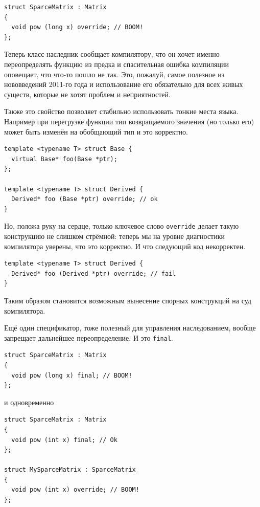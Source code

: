 \documentclass[a4paper,12pt,oneside]{article}
\begin{document}
\begin{lstlisting}
struct SparceMatrix : Matrix
{
  void pow (long x) override; // BOOM!
};
\end{lstlisting}

Теперь класс-наследник сообщает компилятору, что он хочет именно переопределять функцию из предка и спасительная ошибка компиляции оповещает, что что-то пошло не так. Это, пожалуй, самое полезное из нововведений 2011-го года и использование его обязательно для всех живых существ, которые не хотят проблем и неприятностей.

Также это свойство позволяет стабильно использовать тонкие места языка. Например при перегрузке функции тип возвращаемого значения (но только его) может быть изменён на обобщающий тип и это корректно.

\begin{lstlisting}
template <typename T> struct Base {
  virtual Base* foo(Base *ptr);
};

template <typename T> struct Derived {
  Derived* foo (Base *ptr) override; // ok
}
\end{lstlisting}

Но, положа руку на сердце, только ключевое слово \lstinline!override! делает такую конструкцию не слишком стрёмной: теперь мы на уровне диагностики компилятора уверены, что это корректно. И что следующий код некорректен.

\begin{lstlisting}
template <typename T> struct Derived {
  Derived* foo (Derived *ptr) override; // fail
}
\end{lstlisting}

Таким образом становится возможным вынесение спорных конструкций на суд компилятора.

Ещё один спецификатор, тоже полезный для управления наследованием, вообще запрещает дальнейшее переопределение. И это \lstinline!final!.

\begin{lstlisting}
struct SparceMatrix : Matrix
{
  void pow (long x) final; // BOOM!
};
\end{lstlisting}

и одновременно

\begin{lstlisting}
struct SparceMatrix : Matrix
{
  void pow (int x) final; // Ok
};

struct MySparceMatrix : SparceMatrix
{
  void pow (int x) override; // BOOM!
};
\end{lstlisting}
\end{document}
